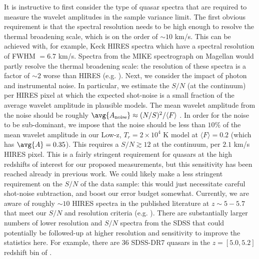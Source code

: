 It is instructive to first consider the type of quasar spectra that are required to measure the wavelet amplitudes in
the sample variance limit. The first obvious requirement is that the spectral resolution needs to be high enough to resolve
the thermal broadening scale, which is on the order of $\sim 10$ km/s. This can be achieved with, for example, Keck HIRES spectra
which have a spectral resolution of FWHM $= 6.7$ km/s. Spectra from the MIKE spectrograph
on Magellan would partly resolve the thermal broadening scale: the resolution of these spectra is a factor of $\sim 2$ worse
than HIRES (e.g. \citealt{Becker:2010cu}). Next, we consider the impact of photon and instrumental noise. In particular,
we estimate the $S/N$ (at the continuum) per HIRES pixel at which the expected shot-noise is a small fraction of the average wavelet amplitude in plausible models. The mean wavelet amplitude from the noise should be roughly 
$\avg{A_{\rm noise}} \approx (N/S)^2/\langle F \rangle$ \citep{Hui:2000rw,Lidz:2009ca}. In order for the noise to be sub-dominant, we impose
that the noise should be less than $10\%$ of the
mean wavelet amplitude in our Low-z, $T_r = 2 \times 10^4$ K model at $\langle F \rangle=0.2$ (which has $\avg{A}=0.35$). This requires a
$S/N \gtrsim 12$ at the continuum, per $2.1$ km/s HIRES pixel. This is a fairly stringent requirement for quasars at the high
redshifts of interest for our proposed measurements, but this sensitivity has been reached already in previous work. We 
could likely make a less stringent
requirement on the $S/N$ of the data sample: this would just necessitate careful shot-noise subtraction, and boost our error budget
somewhat.   
Currently, we are aware of 
roughly $\sim 10$ HIRES spectra in the published literature at $z \sim 5-5.7$ that meet our $S/N$ and resolution criteria 
(e.g. \citealt{Becker:2011ee}). There are substantially larger numbers of lower resolution and $S/N$ spectra
from the SDSS that could potentially be followed-up at higher resolution and sensitivity to improve the statistics here. For example, there
are $36$ SDSS-DR7 quasars in the $z =[5.0,5.2]$ redshift bin of \citet{Becker:2012aq}.

